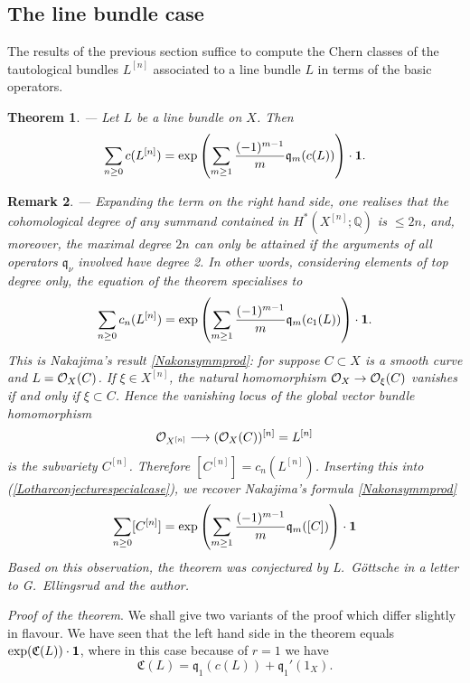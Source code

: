 \documentclass[twoside,11pt]{article}
\newtheorem{theorem}{Theorem}[section]
\newtheorem{remark}[theorem]{Remark}
\newcommand{\prfofthetheorem}{{\kursiv Proof of the theorem}. }
\newcommand{\beeq}[1]{\begin{eqnarray}\label{#1}}
\newcommand{\eneq}{\end{eqnarray}}
\newcommand{\kursiv}{\sl}
\newcommand{\ko}{{\cal O}}
\newcommand{\IQ}{{\mathbb Q}}
\newcommand{\gothq}{{\mathfrak q}}
\newcommand{\gothC}{{\mathfrak C}}
\newcommand{\qq}{\gothq}
\newcommand{\vacuum}{{\bf 1}}
\newcommand{\lra}{\longrightarrow}
\begin{document}

\subsection{The line bundle case}


The results of the previous section suffice to compute the Chern classes
of the tautological bundles $L^{[n]}$ associated to a line bundle $L$ in
terms of the basic operators.

\begin{theorem}\label{Lotharconjecture}--- Let $L$ be a line bundle on $X$. Then
$$\sum_{n\geq0}c(L^{[n]})=\exp\left(\sum_{m\geq1}
\frac{(-1)^{m-1}}{m}\qq_m(c(L))\right)\cdot\vacuum.$$
\end{theorem}


\begin{remark}--- Expanding the term on the right hand side, one realises that
the cohomological degree of any summand contained in $H^*(X^{[n]};\IQ)$ is
$\leq 2n$, and, moreover, the maximal degree
$2n$ can only be attained if the arguments of all operators $\qq_\nu$ involved
have degree 2. In other words, considering elements of
top degree only, the equation of the theorem specialises to
\beeq{Lotharconjecturespecialcase}
\sum_{n\geq0}c_n(L^{[n]})=\exp\left(\sum_{m\geq1}\frac{(-1)^{m-1}}{m}\qq_m(c_1(L))\right)\cdot\vacuum.
\eneq
This is Nakajima's result \ref{Nakonsymmprod}: for suppose $C\subset X$ is a
smooth curve and $L=\ko_X(C)$. If $\xi\in X^{[n]}$, the natural homomorphism
$\ko_X\to\ko_{\xi}(C)$ vanishes if and only if $\xi\subset C$. Hence the 
vanishing locus of the global vector bundle homomorphism
$$\ko_{X^{[n]}}\lra (\ko_X(C))^{[n]}=L^{[n]}$$
is the subvariety $C^{[n]}$. Therefore $[C^{[n]}]=c_n(L^{[n]})$. Inserting this
into (\ref{Lotharconjecturespecialcase}), we recover Nakajima's
formula \ref{Nakonsymmprod}
$$\sum_{n\geq0}[C^{[n]}]=\exp\left(\sum_{m\geq1}\frac{(-1)^{m-1}}{m}\qq_m([C])
\right)\cdot\vacuum$$
Based on this observation, the theorem was conjectured by L.\ G\"ottsche in
a letter to G.\ Ellingsrud and the author.
\end{remark}


\prfofthetheorem We shall give two variants of the proof which differ slightly 
in flavour. We have seen that the left hand side in the theorem equals
$\exp(\gothC(L))\cdot\vacuum$, where in this case because of $r=1$ we have $$\gothC(L)=\qq_1(c(L))+\qq_1'(1_X).$$
\end{document}

